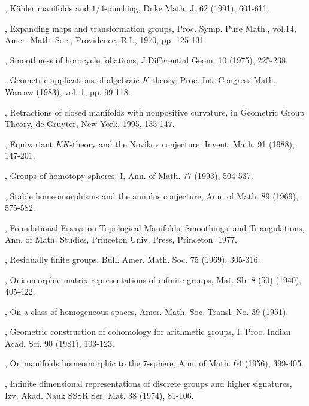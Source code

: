 \begin{thebibliography}{99}
, K\"ahler manifolds and $1/4$-pinching,
  Duke Math. J. 62 (1991), 601-611.


, Expanding maps and transformation groups,
  Proc. Symp. Pure Math., vol.14, Amer. Math. Soc., Providence, R.I.,
  1970, pp. 125-131.

, Smoothness of horocycle
  foliations, J.Differential Geom. 10 (1975), 225-238.

. Geometric applications of algebraic
  $K$-theory, Proc. Int. Congress Math. Warsaw (1983), vol. 1, pp. 99-118.

, Retractions of closed manifolds with nonpositive
  curvature, in Geometric Group Theory, de Gruyter, New York, 1995,
  135-147. 

, Equivariant $KK$-theory and the Novikov
  conjecture, Invent. Math. 91 (1988), 147-201.

, Groups of homotopy spheres:
  I, Ann. of Math. 77 (1993), 504-537.

, Stable homeomorphisms and the annulus
  conjecture, Ann. of Math. 89 (1969), 575-582.

, Foundational Essays on
  Topological Manifolds, Smoothings, and Triangulations, Ann. of
  Math. Studies, Princeton Univ. Press, Princeton, 1977.

, Residually finite groups,
  Bull. Amer. Math. Soc. 75 (1969), 305-316.

, On\pageoriginale isomorphic matrix
  representations of infinite groups, Mat. Sb. 8 (50) (1940), 405-422.

, On a class of homogeneous spaces,
  Amer. Math. Soc. Transl. No. 39 (1951).

, Geometric
  construction of cohomology for arithmetic groups, I, Proc. Indian
  Acad. Sci. 90 (1981), 103-123.

, On manifolds homeomorphic to the
  $7$-sphere, Ann. of Math. 64 (1956), 399-405.

, Infinite dimensional representations of
  discrete groups and higher signatures, Izv. Akad. Nauk SSSR
  Ser. Mat. 38 (1974), 81-106.


\end{thebibliography}
